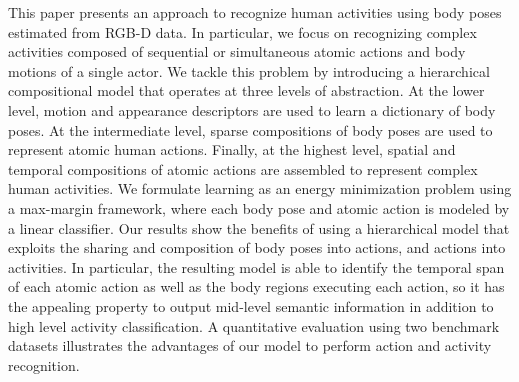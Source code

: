 This paper presents an approach to recognize human activities using
body poses estimated from RGB-D data.
In particular, we focus on recognizing complex activities composed of
sequential or simultaneous atomic actions and body motions of a
single actor. We tackle this problem by introducing a hierarchical
compositional model that operates at three levels of abstraction. At the lower
level, motion and appearance descriptors are used to learn a dictionary of body poses. At
the intermediate level, sparse compositions of body poses are used to
represent atomic human actions. Finally, at the highest level, spatial and
temporal compositions of atomic actions are assembled to represent complex
human activities. We formulate learning as an energy
minimization problem using a max-margin framework, where each body pose and
atomic action is modeled by a linear classifier. Our results show the benefits of using a
hierarchical model that exploits the sharing and composition of body poses into actions, and 
actions into activities. In particular, the resulting model is able to identify the temporal span of 
each atomic action as well as the body regions executing each action, so it
has the appealing property to output mid-level semantic information in addition to 
high level activity classification. A quantitative evaluation using two benchmark
datasets illustrates the advantages of our model to perform %
action and activity recognition.

